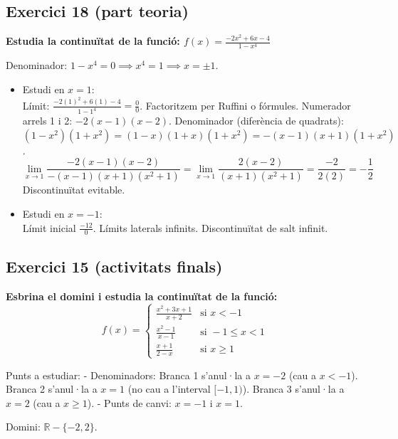 \documentclass[12pt,a4paper]{article}
\begin{document}
\vspace{0.5cm}

\subsection{Exercici 18 (part teoria)}

\textbf{Estudia la continuïtat de la funció: $f(x) = \frac{-2x^2+6x-4}{1-x^4}$}

Denominador: $1-x^4 = 0 \implies x^4 = 1 \implies x = \pm 1$.

\begin{itemize}
    \item Estudi en $x=1$: \\
    Límit: $\frac{-2(1)^2+6(1)-4}{1-1^4} = \frac{0}{0}$. Factoritzem per Ruffini o fórmules. Numerador arrels 1 i 2: $-2(x-1)(x-2)$. Denominador (diferència de quadrats): $(1-x^2)(1+x^2) = (1-x)(1+x)(1+x^2) = -(x-1)(x+1)(1+x^2)$.
    \[ \lim_{x \to 1} \frac{-2(x-1)(x-2)}{-(x-1)(x+1)(x^2+1)} = \lim_{x \to 1} \frac{2(x-2)}{(x+1)(x^2+1)} = \frac{-2}{2(2)} = -\frac{1}{2} \]
    Discontinuïtat evitable.
    
    \item Estudi en $x=-1$: \\
    Límit inicial $\frac{-12}{0}$. Límits laterals infinits. Discontinuïtat de salt infinit.
\end{itemize}

\vspace{0.5cm}

\subsection{Exercici 15 (activitats finals)}

\textbf{Esbrina el domini i estudia la continuïtat de la funció:}
\[ f(x) = \begin{cases} \frac{x^2+3x+1}{x+2} & \text{si } x < -1 \\ \frac{x^2-1}{x-1} & \text{si } -1 \le x < 1 \\ \frac{x+1}{2-x} & \text{si } x \ge 1 \end{cases} \]

Punts a estudiar:
- Denominadors: Branca 1 s'anul·la a $x=-2$ (cau a $x<-1$). Branca 2 s'anul·la a $x=1$ (no cau a l'interval $[-1, 1)$). Branca 3 s'anul·la a $x=2$ (cau a $x \ge 1$). 
- Punts de canvi: $x=-1$ i $x=1$.

Domini: $\mathbb{R} - \{-2, 2\}$.
\end{document}
